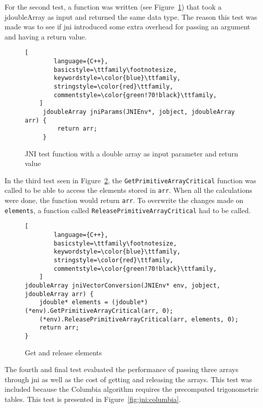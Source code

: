 For the second test, a function was written (see Figure~\ref{fig:jni:params}) that took a jdoubleArray as input and returned the same data type. The reason this test was made was to see if \gls{jni} introduced some extra overhead for passing an argument and having a return value.

\begin{figure}[H]
\begin{lstlisting}[
        language={C++},
        basicstyle=\ttfamily\footnotesize,
        keywordstyle=\color{blue}\ttfamily,
        stringstyle=\color{red}\ttfamily,
        commentstyle=\color{green!70!black}\ttfamily,
    ]
     jdoubleArray jniParams(JNIEnv*, jobject, jdoubleArray arr) {
         return arr;
     }
\end{lstlisting}
\caption{JNI test function with a double array as input parameter and return value}
\label{fig:jni:params}
\end{figure}

In the third test seen in Figure~\ref{fig:jni:conversion}, the \texttt{GetPrimitiveArrayCritical} function was called to be able to access the elements stored in \texttt{arr}. When all the calculations were done, the function would return \texttt{arr}. To overwrite the changes made on \texttt{elements}, a function called \texttt{ReleasePrimitiveArrayCritical} had to be called.

\begin{figure}[H]
\begin{lstlisting}[
        language={C++},
        basicstyle=\ttfamily\footnotesize,
        keywordstyle=\color{blue}\ttfamily,
        stringstyle=\color{red}\ttfamily,
        commentstyle=\color{green!70!black}\ttfamily,
    ]
jdoubleArray jniVectorConversion(JNIEnv* env, jobject, jdoubleArray arr) {
    jdouble* elements = (jdouble*)(*env).GetPrimitiveArrayCritical(arr, 0);
    (*env).ReleasePrimitiveArrayCritical(arr, elements, 0);
    return arr;
}
\end{lstlisting}
\caption{Get and release elements}
\label{fig:jni:conversion}
\end{figure}

The fourth and final test evaluated the performance of passing three arrays through \gls{jni} as well as the cost of getting and releasing the arrays. This test was included because the Columbia algorithm requires the precomputed trigonometric tables. This test is presented in Figure~\ref{fig:jni:columbia}.

